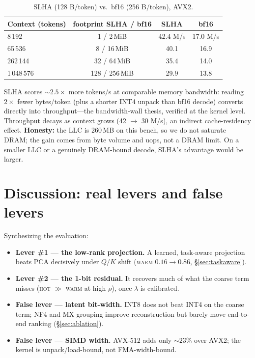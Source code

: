\documentclass[11pt]{article}
\theoremstyle{plain}
\theoremstyle{definition}
\begin{document}
\begin{table}[t]
\centering
\caption{SLHA (128 B/token) vs.\ bf16 (256 B/token), AVX2.}
\label{tab:membw}
\small
\begin{tabular}{@{}lccc@{}}
\toprule
Context (tokens) & footprint SLHA / bf16 & SLHA & bf16 \\
\midrule
8\,192      & 1 / 2\,MiB    & 42.4 M/s & 17.0 M/s \\
65\,536     & 8 / 16\,MiB   & 40.1 & 16.9 \\
262\,144    & 32 / 64\,MiB  & 35.4 & 14.0 \\
1\,048\,576 & 128 / 256\,MiB & 29.9 & 13.8 \\
\bottomrule
\end{tabular}
\end{table}

SLHA scores $\sim\!2.5\times$ more tokens/s at comparable memory
bandwidth: reading $2\times$ fewer bytes/token (plus a shorter INT4
unpack than bf16 decode) converts directly into throughput---the
bandwidth-wall thesis, verified at the kernel level. Throughput decays as
context grows (42 $\to$ 30 M/s), an indirect cache-residency effect.
\textbf{Honesty:} the LLC is 260\,MB on this bench, so we do not saturate
DRAM; the gain comes from byte volume and uops, not a DRAM limit. On a
smaller LLC or a genuinely DRAM-bound decode, SLHA's advantage would be
larger.

\section{Discussion: real levers and false levers}
\label{sec:discussion}
Synthesizing the evaluation:

\begin{itemize}[leftmargin=1.4em,itemsep=2pt]
  \item \textbf{Lever \#1 --- the low-rank projection.} A learned,
    task-aware projection beats PCA decisively under $Q/K$ shift
    (\textsc{warm} $0.16 \to 0.86$, \S\ref{sec:taskaware}).
  \item \textbf{Lever \#2 --- the 1-bit residual.} It recovers much of
    what the coarse term misses (\textsc{hot} $\gg$ \textsc{warm} at high
    $\rho$), once $\lambda$ is calibrated.
  \item \textbf{False lever --- latent bit-width.} INT8 does not beat
    INT4 on the coarse term; NF4 and MX grouping improve reconstruction
    but barely move end-to-end ranking (\S\ref{sec:ablation}).
  \item \textbf{False lever --- SIMD width.} AVX-512 adds only
    $\sim\!23\%$ over AVX2; the kernel is unpack/load-bound, not
    FMA-width-bound.
\end{itemize}
\end{document}
